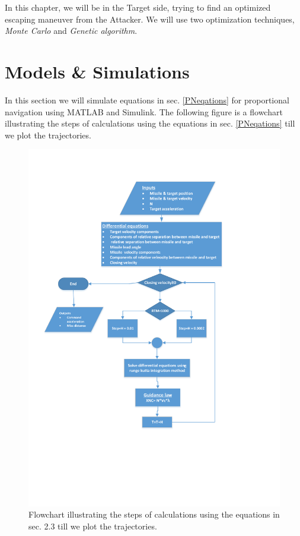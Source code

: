 \label{optimization_EM}

In this chapter, we will be in the Target side, trying  to find an optimized escaping maneuver from the Attacker. We will use two optimization techniques, \textit{Monte Carlo} and \textit{Genetic algorithm}.


\section{Models \& Simulations}

In this section we will simulate equations in sec. \ref{PNeqations} for proportional navigation using MATLAB and Simulink.
The following figure is a flowchart illustrating the steps of calculations using the equations in sec. \ref{PNeqations}  till we plot the trajectories.

\begin{figure}[H]
	\centering
	\includegraphics[scale = 0.5]{fig/FlowchartPN.pdf}
	\caption{Flowchart illustrating the steps of calculations using the equations in sec. 2.3  till we plot the trajectories.}
	\label{flowchart PN}
\end{figure}



